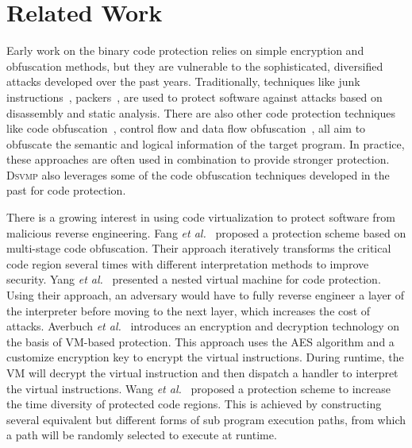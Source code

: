 \documentclass[preprint,12pt,3p]{elsarticle}
\makeatletter
\newcommand{\DSVMP}{\textsc{Dsvmp}\xspace}
\newcommand{\tabincell}[2]{\begin{tabular}{@{}#1@{}}#2\end{tabular}}
\makeatother
\begin{document}


\section{Related Work}\label{sec:work}
Early work on the binary code protection relies on simple encryption and obfuscation methods,
but they are vulnerable to the sophisticated, diversified attacks developed over the past years.
Traditionally, techniques like junk instructions~\cite{23linn2003obfuscation}, packers~\cite{25Execryptor,26upx},
are used to protect software against attacks based on disassembly and static analysis.
There are also other code protection techniques like code obfuscation~\cite{25wu2010mimimorphism},
control flow and data flow obfuscation~\cite{13liem2008compiler,27ge2005control,27balachandran2014function},
all aim to obfuscate the semantic and logical information of the target program.
In practice, these approaches are often used in combination to provide stronger protection.
\DSVMP also leverages some of the code obfuscation techniques developed in the past for code protection.

There is a growing interest in using code virtualization to protect software from malicious reverse engineering.
Fang \emph{et al.}~\cite{5fang2011multi} proposed a protection scheme based on multi-stage code obfuscation.
Their approach iteratively transforms the critical code region several times with different interpretation methods to improve security.
Yang \emph{et al.}~\cite{6ming2011software} presented a nested virtual machine for code protection.
Using their approach, an adversary would have to fully reverse engineer a layer of the interpreter before moving to the next layer,
which increases the cost of attacks.
Averbuch \emph{et al.}~\cite{27averbuch2011efficient} introduces an encryption and decryption technology
on the basis of VM-based protection. This approach uses the AES algorithm and a customize encryption key
to encrypt the virtual instructions. During runtime, the VM will decrypt the virtual instruction and then
dispatch a handler to interpret the virtual instructions.
Wang \emph{et al.}~\cite{7wang2014tdvmp} proposed a protection scheme to increase the time diversity of protected code regions.
This is achieved by constructing several equivalent but different forms of sub program execution paths,
from which a path will be randomly selected to execute at runtime.
\end{document}
